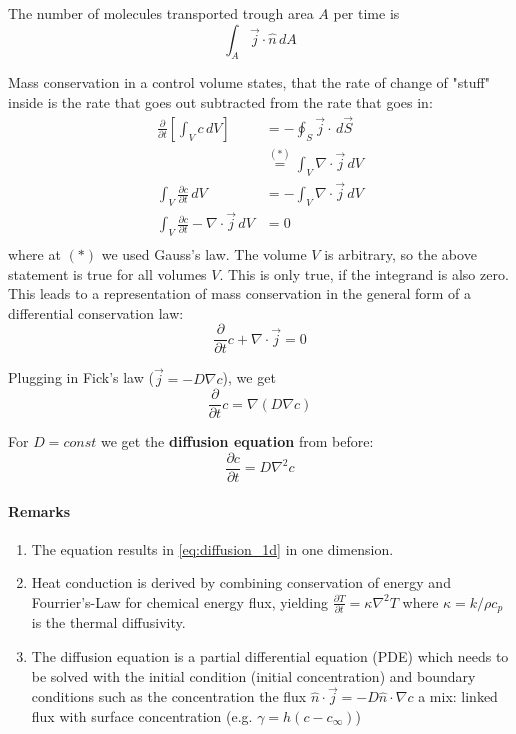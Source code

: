 The number of molecules transported trough area $A$ per time is
\begin{equation*}
	\int_A \vec j \cdot \hat n \, dA
\end{equation*}


Mass conservation in a control volume states, that the rate of change of "stuff" inside is the rate that goes out subtracted from the rate that goes in:
\begin{equation*}
	\begin{split}
	\frac \partial {\partial t}\left[\int_V c\,dV\right] &= -\oint_S \vec j \cdot \,d\vec S\\
	&\stackrel{(*)}{=} \int_V \nabla \cdot \vec j \,dV\\
	\int_V\frac{\partial c}{\partial t}\,dV &= -\int_V \nabla \cdot \vec j \,dV\\
	\int_V\frac{\partial c}{\partial t}- \nabla \cdot \vec j \,dV &= 0\\
	\end{split}
\end{equation*}
where at $(*)$ we used Gauss's law. The volume $V$ is arbitrary, so the above statement is true for all volumes $V$. This is only true, if the integrand is also zero. This leads to a representation of mass conservation in the general form of a differential conservation law:
\begin{equation*}
	\frac{\partial}{\partial t} c + \nabla \cdot \vec j = 0
\end{equation*}

Plugging in Fick's law ($\vec j = -D\nabla c$), we get
\begin{equation*}
	\frac{\partial}{\partial t}c = \nabla (D\nabla c)
\end{equation*}

For $D=const$ we get the \textbf{diffusion equation} from before:
\begin{equation}
	\boxed{\frac{\partial c}{\partial t} = D \nabla^2 c}
\end{equation}

\paragraph{Remarks}

\begin{enumerate}
	\setlength{\itemsep}{-5pt}
	\item The equation results in \eqref{eq:diffusion_1d} in one dimension.
	\item Heat conduction is derived by combining conservation of energy and Fourrier's-Law for chemical energy flux, yielding $\frac{\partial T}{\partial t} = \kappa \nabla ^2 T$ where $\kappa= k/\rho c_p$ is the thermal diffusivity.
	\item The diffusion equation is a partial differential equation (PDE) which needs to be solved with the initial condition (initial concentration) and boundary conditions such as
	\subitem the concentration
	\subitem the flux  $\hat n \cdot \vec j = -D\hat n  \cdot \nabla c$
	\subitem a mix: linked flux with surface concentration (e.g. $\gamma = h(c-c_\infty)$)
\end{enumerate}
 

